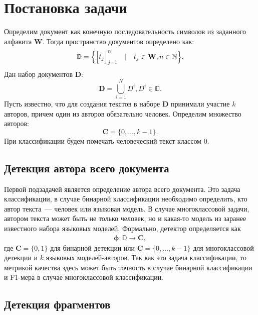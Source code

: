\section{Постановка задачи}
\label{sec1}
Определим документ как конечную последовательность символов из заданного алфавита $\mathbf{W}$. Тогда пространство документов определено как:
$$\mathbb{D} = \Bigl\{\Big[t_j\Big]_{j=1}^n \quad|\quad t_j \in \mathbf{W}, n \in \mathbb{N}\Bigr\}.$$
Дан набор документов $\mathbf{D}$:
$$\mathbf{D} = \bigcup_{i=1}^{N}D^i, D^i \in \mathbb{D}. $$
Пусть известно, что для создания текстов в наборе $\mathbf{D}$ принимали участие $k$ авторов, причем один из авторов обязательно человек. Определим множество авторов:
$$\mathbf{C} = \{0, \dots, k - 1\}.$$
При классификации будем помечать человеческий текст классом 0.

\subsection{Детекция автора всего документа}
\label{binary_detection}

Первой подзадачей является определение автора всего документа. Это задача классификации, в случае бинарной классификации необходимо определить, кто автор текста~--- человек или языковая модель. В случае многоклассовой задачи, автором текста может быть не только человек, но и какая-то модель из заранее известного набора языковых моделей. Формально, детектор определяется как
\begin{align}
    \mathbf{\phi}: \mathbb{D} \rightarrow  \mathbf{C},
\end{align}
где $\mathbf{C} = \{0,1\}$ для бинарной детекции
или $\mathbf{C} = \{0, \dots, k - 1\}$ для многоклассовой детекции и $k$ языковых моделей-авторов. Так как это задача классификации, то метрикой качества здесь может быть точность в случае бинарной классификации и F1-мера в случае многоклассовой классификации.



\subsection{Детекция фрагментов}
\label{fragment_detection}


